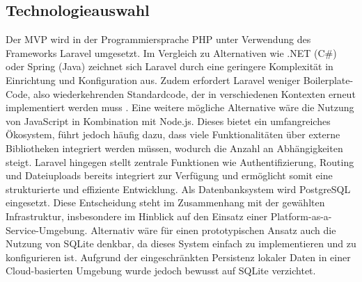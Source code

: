 \subsection{Technologieauswahl}
Der MVP wird in der Programmiersprache PHP unter Verwendung des Frameworks Laravel umgesetzt. 
Im Vergleich zu Alternativen wie .NET (C\#) oder Spring (Java) zeichnet sich Laravel durch eine geringere Komplexität in Einrichtung und Konfiguration aus. 
Zudem erfordert Laravel weniger Boilerplate-Code, also wiederkehrenden Standardcode, der in verschiedenen Kontexten erneut implementiert werden muss \parencite{boiler}.
\newline
Eine weitere mögliche Alternative wäre die Nutzung von JavaScript in Kombination mit Node.js. 
Dieses bietet ein umfangreiches Ökosystem, führt jedoch häufig dazu, dass viele Funktionalitäten über externe Bibliotheken integriert werden müssen, wodurch die Anzahl an Abhängigkeiten steigt. 
Laravel hingegen stellt zentrale Funktionen wie Authentifizierung, Routing und Dateiuploads bereits integriert zur Verfügung und ermöglicht somit eine strukturierte und effiziente Entwicklung.
\newline
Als Datenbanksystem wird PostgreSQL eingesetzt. 
Diese Entscheidung steht im Zusammenhang mit der gewählten Infrastruktur, insbesondere im Hinblick auf den Einsatz einer Platform-as-a-Service-Umgebung. 
Alternativ wäre für einen prototypischen Ansatz auch die Nutzung von SQLite denkbar, da dieses System einfach zu implementieren und zu konfigurieren ist. 
Aufgrund der eingeschränkten Persistenz lokaler Daten in einer Cloud-basierten Umgebung wurde jedoch bewusst auf SQLite verzichtet.

